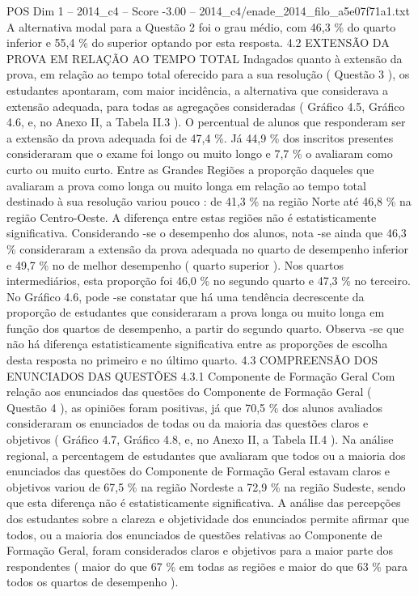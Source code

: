 \begin{textsample}{POS Dim 1 – 2014\_c4 – Score -3.00 – 2014\_c4/enade\_2014\_filo\_a5e07f71a1.txt}
A alternativa modal para a Questão 2 foi o grau médio, com 46,3 \% do quarto inferior e 55,4 \% do superior optando por esta resposta. 4.2 EXTENSÃO DA PROVA EM RELAÇÃO AO TEMPO TOTAL Indagados quanto à extensão da prova, em relação ao tempo total oferecido para a sua resolução ( Questão 3 ), os estudantes apontaram, com maior incidência, a alternativa que considerava a extensão adequada, para todas as agregações consideradas ( Gráfico 4.5, Gráfico 4.6, e, no Anexo II, a Tabela II.3 ).
O percentual de alunos que responderam ser a extensão da prova adequada foi de 47,4 \%.
Já 44,9 \% dos inscritos presentes consideraram que o exame foi longo ou muito longo e 7,7 \% o avaliaram como curto ou muito curto.
Entre as Grandes Regiões a proporção daqueles que avaliaram a prova como longa ou muito longa em relação ao tempo total destinado à sua resolução variou pouco : de 41,3 \% na região Norte até 46,8 \% na região Centro-Oeste.
A diferença entre estas regiões não é estatisticamente significativa.
Considerando -se o desempenho dos alunos, nota -se ainda que 46,3 \% consideraram a extensão da prova adequada no quarto de desempenho inferior e 49,7 \% no de melhor desempenho ( quarto superior ).
Nos quartos intermediários, esta proporção foi 46,0 \% no segundo quarto e 47,3 \% no terceiro.
No Gráfico 4.6, pode -se constatar que há uma tendência decrescente da proporção de estudantes que consideraram a prova longa ou muito longa em função dos quartos de desempenho, a partir do segundo quarto.
Observa -se que não há diferença estatisticamente significativa entre as proporções de escolha desta resposta no primeiro e no último quarto. 4.3 COMPREENSÃO DOS ENUNCIADOS DAS QUESTÕES 4.3.1 Componente de Formação Geral Com relação aos enunciados das questões do Componente de Formação Geral ( Questão 4 ), as opiniões foram positivas, já que 70,5 \% dos alunos avaliados consideraram os enunciados de todas ou da maioria das questões claros e objetivos ( Gráfico 4.7, Gráfico 4.8, e, no Anexo II, a Tabela II.4 ).
Na análise regional, a percentagem de estudantes que avaliaram que todos ou a maioria dos enunciados das questões do Componente de Formação Geral estavam claros e objetivos variou de 67,5 \% na região Nordeste a 72,9 \% na região Sudeste, sendo que esta diferença não é estatisticamente significativa.
A análise das percepções dos estudantes sobre a clareza e objetividade dos enunciados permite afirmar que todos, ou a maioria dos enunciados de questões relativas ao Componente de Formação Geral, foram considerados claros e objetivos para a maior parte dos respondentes ( maior do que 67 \% em todas as regiões e maior do que 63 \% para todos os quartos de desempenho ).

\end{textsample}
